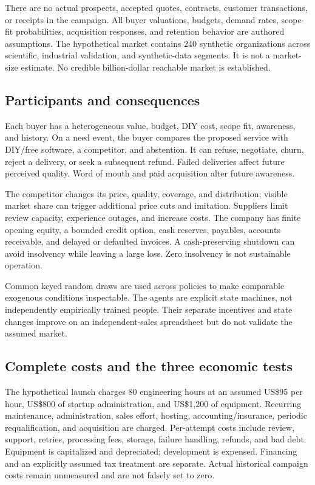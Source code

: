 \documentclass[11pt,letterpaper]{article}
\newcommand{\USD}[1]{US\$#1}
\begin{document}
There are no actual prospects, accepted quotes, contracts, customer transactions, or
receipts in the campaign. All buyer valuations, budgets, demand rates, scope-fit
probabilities, acquisition responses, and retention behavior are authored assumptions.
The hypothetical market contains 240 synthetic organizations across scientific,
industrial validation, and synthetic-data segments. It is not a market-size estimate.
No credible billion-dollar reachable market is established.

\subsection{Participants and consequences}

Each buyer has a heterogeneous value, budget, DIY cost, scope fit, awareness, and
history. On a need event, the buyer compares the proposed service with DIY/free
software, a competitor, and abstention. It can refuse, negotiate, churn, reject a
delivery, or seek a subsequent refund. Failed deliveries affect future perceived
quality. Word of mouth and paid acquisition alter future awareness.

The competitor changes its price, quality, coverage, and distribution; visible market
share can trigger additional price cuts and imitation. Suppliers limit review capacity,
experience outages, and increase costs. The company has finite opening equity, a
bounded credit option, cash reserves, payables, accounts receivable, and delayed or
defaulted invoices. A cash-preserving shutdown can avoid insolvency while leaving a
large loss. Zero insolvency is not sustainable operation.

Common keyed random draws are used across policies to make comparable exogenous
conditions inspectable. The agents are explicit state machines, not independently
empirically trained people. Their separate incentives and state changes improve on
an independent-sales spreadsheet but do not validate the assumed market.

\subsection{Complete costs and the three economic tests}

The hypothetical launch charges 80 engineering hours at an assumed \USD{95} per hour,
\USD{800} of startup administration, and \USD{1,200} of equipment. Recurring maintenance,
administration, sales effort, hosting, accounting/insurance, periodic requalification,
and acquisition are charged. Per-attempt costs include review, support, retries,
processing fees, storage, failure handling, refunds, and bad debt. Equipment is
capitalized and depreciated; development is expensed. Financing and an explicitly
assumed tax treatment are separate. Actual historical campaign costs remain unmeasured
and are not falsely set to zero.
\end{document}
